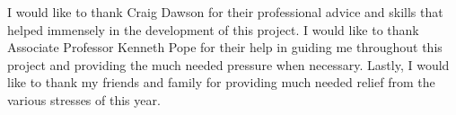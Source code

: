 \documentclass[
12pt, %
oneside, %
english, %
onehalfspacing, %
headsepline, %
]{MastersDoctoralThesis} %
\begin{document}
\begin{acknowledgements}
\addchaptertocentry{\acknowledgementname} %
I would like to thank Craig Dawson for their professional advice and skills that helped immensely in the development of this project.
I would like to thank Associate Professor Kenneth Pope for their help in guiding me throughout this project and providing the much needed pressure when necessary.
Lastly, I would like to thank my friends and family for providing much needed relief from the various stresses of this year.
\end{acknowledgements}


\tableofcontents %

\listoffigures %









\end{document}
